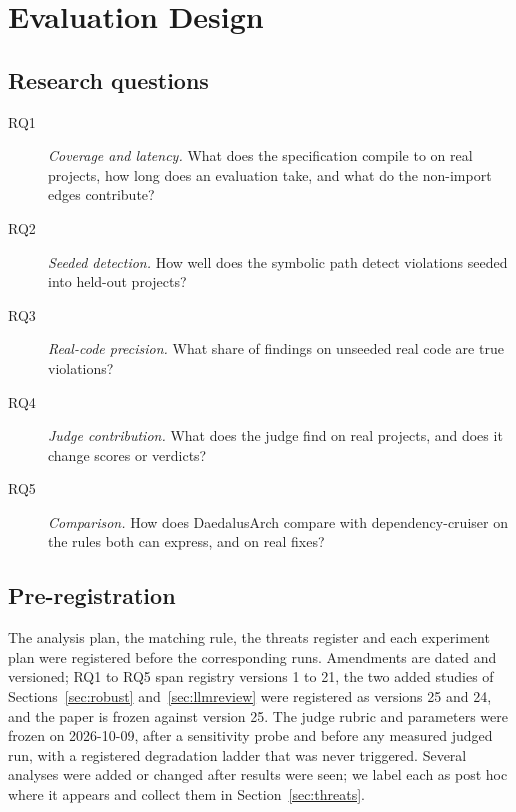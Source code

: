 \documentclass[10pt,a4paper]{article}
\newcommand{\tool}{DaedalusArch}
\newcommand{\dc}{dependency-cruiser}
\begin{document}
\section{Evaluation Design}\label{sec:design}

\subsection{Research questions}

\begin{description}
  \item[RQ1] \emph{Coverage and latency.} What does the specification compile to on real projects, how long does an
        evaluation take, and what do the non-import edges contribute?
  \item[RQ2] \emph{Seeded detection.} How well does the symbolic path detect violations seeded into held-out projects?
  \item[RQ3] \emph{Real-code precision.} What share of findings on unseeded real code are true violations?
  \item[RQ4] \emph{Judge contribution.} What does the judge find on real projects, and does it change scores or verdicts?
  \item[RQ5] \emph{Comparison.} How does \tool{} compare with \dc{} on the rules both can express, and on real fixes?
\end{description}

\subsection{Pre-registration}

The analysis plan, the matching rule, the threats register and each experiment plan were registered before the
corresponding runs. %
Amendments are dated and versioned; RQ1 to RQ5 span registry versions 1 to 21, the two added studies of
Sections~\ref{sec:robust} and~\ref{sec:llmreview} were registered as versions 25 and 24, and the paper is frozen
against version 25. %
The judge rubric
and parameters were frozen on 2026-10-09, after a sensitivity probe and before any measured judged run, with a
registered degradation ladder that was never triggered. %
Several analyses were added or changed after results were seen; we label each as post hoc where it appears and
collect them in Section~\ref{sec:threats}.
\end{document}

